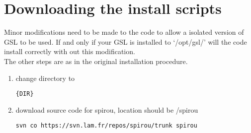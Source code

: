 \section{Downloading the install scripts}
\label{section:downloading_install_Scripts}

Minor modifications need to be made to the code to allow a isolated version of GSL to be used. If and only if your GSL is installed to `/opt/gsl/' will the code install correctly with out this modification. \\

\noindent The other steps are as in the original installation procedure. \\

\begin{enumerate}
\item change directory to 
\begin{lstlisting}[style=bashstyle]
{DIR}
\end{lstlisting}

\item download source code for spirou, location should be /spirou
\begin{lstlisting}[style=bashstyle]
svn co https://svn.lam.fr/repos/spirou/trunk spirou
\end{lstlisting}

\end{enumerate}

